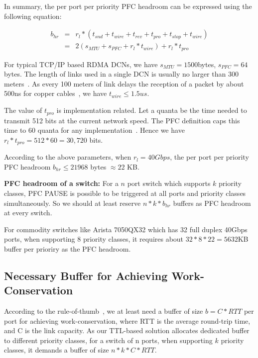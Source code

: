 In summary, the per port per priority PFC headroom can be expressed using the following equation:


\begin{eqnarray} \label{eqn:pfcheadroom}
b_{hr} &=& r_{l}*(t_{snd}+t_{wire}+t_{rev}+t_{pro}+t_{stop}+t_{wire})     \nonumber \\
&=& 2(s_{MTU}+s_{PFC}+r_l*t_{wire})+r_l*t_{pro}
\end{eqnarray}

For typical TCP/IP based RDMA DCNs, we have $s_{MTU}=1500$bytes, $s_{PFC}=64$bytes. The length of links used in a single DCN is usually no larger than 300 meters~\cite{rdmaatscale}. As every 100 meters of link delays the reception of a packet by about 500ns for copper cables~\cite{pfcheadroom}, we have $t_{wire} \leq 1.5us$.  

The value of  $t_{pro}$ is implementation related. Let a quanta be the time needed to transmit 512 bits at the current network speed. The PFC definition caps this time to 60 quanta for any implementation~\cite{pfcheadroom}. Hence we have $r_l*t_{pro}=512 * 60 = 30,720 $ bits.

According to the above parameters, when  $r_l=40Gbps$, the per port per priority PFC headroom $b_{hr} \leq 21968$ bytes $\approx 22$ KB.

\textbf{PFC headroom of a switch:} For a $n$ port switch which supports $k$ priority classes, PFC PAUSE is possible to be triggered at all ports and priority classes simultaneously. So we should at least reserve $n*k*b_{hr}$ buffers as PFC headroom at every switch. 

For commodity switches like Arista 7050QX32 which has 32 full duplex 40Gbps ports, when supporting 8 priority classes, it requires about $32*8*22=5632$KB buffer per prioriry as the PFC headroom.

\subsection{Necessary Buffer for Achieving Work-Conservation}\label{subsec:bufferthroughput}

According to the rule-of-thumb~\cite{crtt,sizingrouterbuffer}, we at least need a buffer of size $b = C*RTT$ per port for achieving work-conservation, where RTT is the average round-trip time, and C is the link capacity. As our TTL-based solution allocates dedicated buffer to different priority classes, for a switch of n ports, when supporting $k$ priority classes, it demands a buffer of size $n*k*C*RTT$. 

